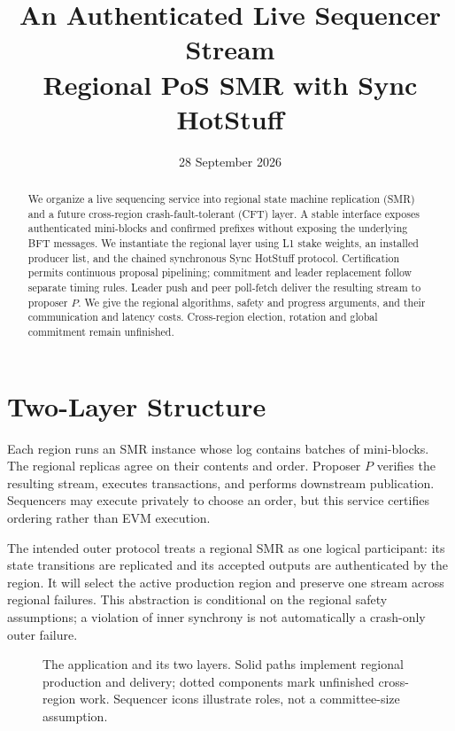\documentclass[11pt,a4paper,onecolumn]{article}
\title{An Authenticated Live Sequencer Stream\\
\large Regional PoS SMR with Sync HotStuff}
\author{}\date{28 September 2026}
\newcounter{protocol}
\begin{document}
\maketitle
\begin{abstract}
We organize a live sequencing service into regional state machine replication
(SMR) and a future cross-region crash-fault-tolerant (CFT) layer. A stable
interface exposes authenticated mini-blocks and confirmed prefixes without
exposing the underlying BFT messages. We instantiate the regional layer using
L1 stake weights, an installed producer list, and the chained synchronous
Sync HotStuff protocol. Certification permits continuous proposal pipelining;
commitment and leader replacement follow separate timing rules. Leader push
and peer poll-fetch deliver the resulting stream to proposer $P$. We give
the regional algorithms, safety and progress arguments, and their communication
and latency costs. Cross-region election, rotation and global commitment remain
unfinished.
\end{abstract}

\section{Two-Layer Structure}\label{sec:architecture}
Each region runs an SMR instance whose log contains batches of mini-blocks.
The regional replicas agree on their contents and order. Proposer $P$ verifies
the resulting stream, executes transactions, and performs downstream
publication. Sequencers may execute privately to choose an order, but this
service certifies ordering rather than EVM execution.

The intended outer protocol treats a regional SMR as one logical participant:
its state transitions are replicated and its accepted outputs are authenticated
by the region. It will select the active production region and preserve one
stream across regional failures. This abstraction is conditional on the
regional safety assumptions; a violation of inner synchrony is not
automatically a crash-only outer failure.

\begin{figure}[H]\centering

\caption{The application and its two layers. Solid paths implement regional
production and delivery; dotted components mark unfinished cross-region work.
Sequencer icons illustrate roles, not a committee-size assumption.}
\label{fig:architecture}
\end{figure}
\end{document}
